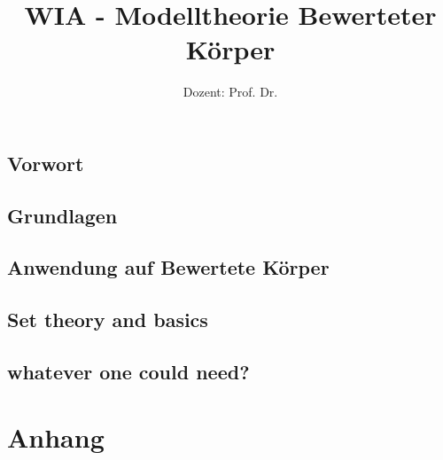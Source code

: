 \documentclass[ngerman,a4paper,order=firstname]{mathscript}
\title{\textbf{WIA - Modelltheorie Bewerteter Körper}}
\author{Dozent: Prof. Dr. \person{Arno Fehm}}
\begin{document}
\pagestyle{plain}

\maketitle

\hypertarget{tocpage}{}
\tableofcontents
{}

\pagebreak
{}
\pagestyle{fancy}

\chapter*{Vorwort}

\chapter{Grundlagen}



\chapter{Anwendung auf Bewertete Körper}

\begin{appendices}
	\chapter{Set theory and basics} %
		
	\chapter{whatever one could need?}	
\end{appendices}

\part*{Anhang}
\appendix

\nocite{*}
%



\printindex
\end{document}
